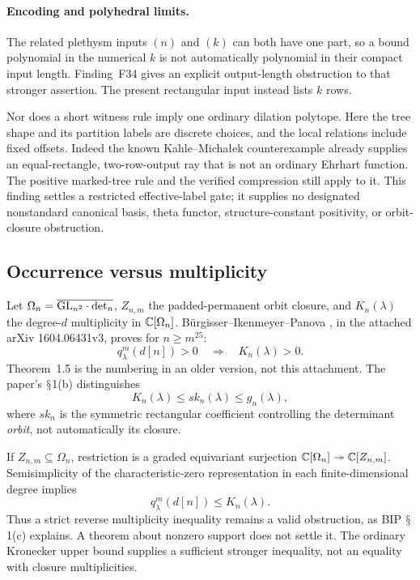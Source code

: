 \documentclass[11pt,a4paper]{article}
\renewcommand{\S}{\ensuremath{\mathsection}}
\newcommand{\fid}[1]{\textsf{#1}}\newcommand{\gate}[1]{\textsf{#1}}
\theoremstyle{named}\newtheorem{finding}{Finding}[section]
\theoremstyle{definition}\newtheorem{definition}[finding]{Definition}
\theoremstyle{remark}\newtheorem{remark}[finding]{Remark}
\begin{document}
\paragraph{Encoding and polyhedral limits.}
The related plethysm inputs $(n)$ and $(k)$ can both have one part,
so a bound polynomial in the numerical $k$ is not automatically
polynomial in their compact input length. Finding~\fid{F34} gives
an explicit output-length obstruction to that stronger assertion.
The present rectangular input instead lists $k$ rows.

Nor does a short witness rule imply one ordinary dilation polytope.
Here the tree shape and its partition labels are discrete choices,
and the local relations include fixed offsets. Indeed the known
Kahle--Micha{\l}ek counterexample
\cite[Theorem~5 and Remark~6, p.~4; rectangular identification, p.~6]{KM}
already supplies an equal-rectangle, two-row-output ray that is
not an ordinary Ehrhart function. The positive marked-tree rule
and the verified compression still apply to it.
This finding settles a restricted effective-label gate; it supplies
no designated nonstandard canonical basis, theta functor,
structure-constant positivity, or orbit-closure obstruction.


\subsection{Occurrence versus multiplicity}
Let $\Omega_n=\overline{\mathrm{GL}_{n^2}\cdot\det_n}$, $Z_{n,m}$ the padded-permanent orbit closure, and $K_n(\lambda)$ the degree-$d$ multiplicity in $\mathbb C[\Omega_n]$. B\"urgisser--Ikenmeyer--Panova \cite[Theorem 1.4]{BIP}, in the attached arXiv 1604.06431v3, proves for $n\ge m^{25}$:
\[
 q^m_\lambda(d[n])>0\quad\Longrightarrow\quad K_n(\lambda)>0.
\]
Theorem~1.5 is the numbering in an older version, not this attachment. The paper's \S1(b) distinguishes
\[
 K_n(\lambda)\le sk_n(\lambda)\le g_n(\lambda),
\]
where $sk_n$ is the symmetric rectangular coefficient controlling the determinant \emph{orbit}, not automatically its closure.

If $Z_{n,m}\subseteq\Omega_n$, restriction is a graded equivariant surjection
$\mathbb C[\Omega_n]\twoheadrightarrow\mathbb C[Z_{n,m}]$. Semisimplicity of the characteristic-zero representation in each finite-dimensional degree implies
\[
 q^m_\lambda(d[n])\le K_n(\lambda).
\]
Thus a strict reverse multiplicity inequality remains a valid obstruction, as BIP \S1(c) explains. A theorem about nonzero support does not settle it. The ordinary Kronecker upper bound supplies a sufficient stronger inequality, not an equality with closure multiplicities.
\end{document}
